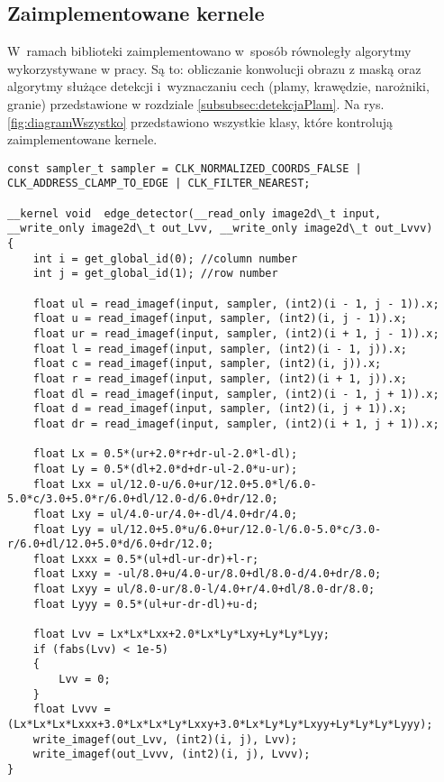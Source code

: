 \subsection{Zaimplementowane kernele}
\label{subsec:kernele}

W~ramach biblioteki zaimplementowano w~sposób równoległy algorytmy wykorzystywane w pracy. Są to: obliczanie konwolucji obrazu z maską oraz algorytmy służące detekcji i~wyznaczaniu cech (plamy, krawędzie, narożniki, granie) przedstawione w rozdziale \ref{subsubsec:detekcjaPlam}. Na rys. \ref{fig:diagramWszystko} przedstawiono wszystkie klasy, które kontrolują zaimplementowane kernele.


\begin{lstlisting}[float]
const sampler_t sampler = CLK_NORMALIZED_COORDS_FALSE | CLK_ADDRESS_CLAMP_TO_EDGE | CLK_FILTER_NEAREST;

__kernel void  edge_detector(__read_only image2d\_t input, __write_only image2d\_t out_Lvv, __write_only image2d\_t out_Lvvv)
{
	int i = get_global_id(0); //column number
	int j = get_global_id(1); //row number

	float ul = read_imagef(input, sampler, (int2)(i - 1, j - 1)).x;
	float u = read_imagef(input, sampler, (int2)(i, j - 1)).x;
	float ur = read_imagef(input, sampler, (int2)(i + 1, j - 1)).x;
	float l = read_imagef(input, sampler, (int2)(i - 1, j)).x;
	float c = read_imagef(input, sampler, (int2)(i, j)).x;
	float r = read_imagef(input, sampler, (int2)(i + 1, j)).x;
	float dl = read_imagef(input, sampler, (int2)(i - 1, j + 1)).x;
	float d = read_imagef(input, sampler, (int2)(i, j + 1)).x;
	float dr = read_imagef(input, sampler, (int2)(i + 1, j + 1)).x;

	float Lx = 0.5*(ur+2.0*r+dr-ul-2.0*l-dl);
	float Ly = 0.5*(dl+2.0*d+dr-ul-2.0*u-ur);
	float Lxx = ul/12.0-u/6.0+ur/12.0+5.0*l/6.0-5.0*c/3.0+5.0*r/6.0+dl/12.0-d/6.0+dr/12.0;
	float Lxy = ul/4.0-ur/4.0+-dl/4.0+dr/4.0;
	float Lyy = ul/12.0+5.0*u/6.0+ur/12.0-l/6.0-5.0*c/3.0-r/6.0+dl/12.0+5.0*d/6.0+dr/12.0;
	float Lxxx = 0.5*(ul+dl-ur-dr)+l-r;
	float Lxxy = -ul/8.0+u/4.0-ur/8.0+dl/8.0-d/4.0+dr/8.0;
	float Lxyy = ul/8.0-ur/8.0-l/4.0+r/4.0+dl/8.0-dr/8.0;
	float Lyyy = 0.5*(ul+ur-dr-dl)+u-d;
	
	float Lvv = Lx*Lx*Lxx+2.0*Lx*Ly*Lxy+Ly*Ly*Lyy;
	if (fabs(Lvv) < 1e-5)
	{
		Lvv = 0;
	}
	float Lvvv = (Lx*Lx*Lx*Lxxx+3.0*Lx*Lx*Ly*Lxxy+3.0*Lx*Ly*Ly*Lxyy+Ly*Ly*Ly*Lyyy);
	write_imagef(out_Lvv, (int2)(i, j), Lvv);
	write_imagef(out_Lvvv, (int2)(i, j), Lvvv);
}
\end{lstlisting}


